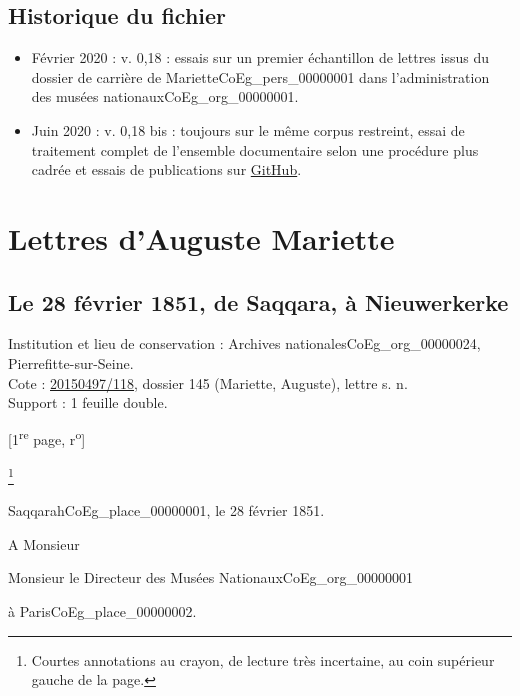 \documentclass{book}
\begin{document}
\section*{Historique du fichier}
\begin{itemize}
\item Février 2020 : v. 0,18 : essais sur un premier échantillon de lettres issus du dossier de carrière de Mariette\gls{CoEg_pers_00000001} dans l'administration des musées nationaux\gls{CoEg_org_00000001}.
\item Juin 2020 : v. 0,18 bis : toujours sur le même corpus restreint, essai de traitement complet de l'ensemble documentaire selon une procédure plus cadrée et essais de publications sur \href{https://thlebee.github.io/CoEg_test_forty/}{GitHub}.
\end{itemize}

\mainmatter

\chapter*{Lettres d'Auguste Mariette}
\section*{Le 28 février 1851, de Saqqara, à Nieuwerkerke} \label{CoEg_Mariette_1851-02-28} 
{\footnotesize
\noindent Institution et lieu de conservation : Archives nationales\gls{CoEg_org_00000024}, Pierrefitte-sur-Seine.\\
Cote : \hyperref[CoEg_Mariette_ms_001]{20150497/118}, dossier 145 (Mariette, Auguste), lettre s. n.\\
Support : 1 feuille double.
\begin{center} {[1\textsuperscript{re} page, r\textsuperscript{o}]}\end{center}}
\footnote{Courtes annotations au crayon, de lecture très incertaine, au coin supérieur gauche de la page.}
\begin{flushright}
Saqqarah\gls{CoEg_place_00000001}, le 28 février 1851.
\end{flushright}
A Monsieur
\begin{center} Monsieur le Directeur des Musées Nationaux\gls{CoEg_org_00000001}\end{center}
\begin{flushright}à Paris\gls{CoEg_place_00000002}.\end{flushright}
\end{document}
